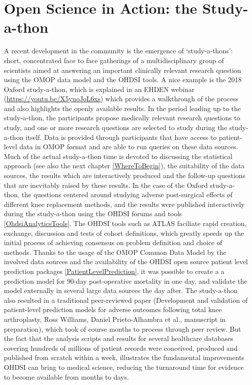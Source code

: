 \documentclass[11pt]{book}
\theoremstyle{definition}
\theoremstyle{definition}
\theoremstyle{definition}
\theoremstyle{remark}
\begin{document}
\hypertarget{open-science-in-action-the-study-a-thon}{%
\section{Open Science in Action: the Study-a-thon}\label{open-science-in-action-the-study-a-thon}}


A recent development in the community is the emergence of `study-a-thons': short, concentrated face to face gatherings of a multidisciplinary group of scientists aimed at answering an important clinically relevant research question using the OMOP data model and the OHDSI tools. A nice example is the 2018 Oxford study-a-thon, which is explained in an EHDEN webinar (\url{https://youtu.be/X5yuoJoL6xs}) which provides a walkthrough of the process and also highlights the openly available results. In the period leading up to the study-a-thon, the participants propose medically relevant research questions to study, and one or more research questions are selected to study during the study-a-thon itself. Data is provided through participants that have access to patient-level data in OMOP format and are able to run queries on these data sources. Much of the actual study-a-thon time is devoted to discussing the statistical approach (see also the next chapter \ref{WhereToBegin}), the suitability of the data sources, the results which are interactively produced and the follow-up questions that are inevitably raised by these results. In the case of the Oxford study-a-thon, the questions centered around studying adverse post-surgical effects of different knee replacement methods, and the results were published interactively during the study-a-thon using the OHDSI forums and tools \ref{OhdsiAnalyticsTools}. The OHDSI tools such as ATLAS faciliate rapid creation, exchange, discussion and tests of cohort definitions, which greatly speeds up the initial process of achieving consensus on problem definition and choice of methods. Thanks to the usage of the OMOP Common Data Model by the involved data sources and the availability of the OHDSI open source patient level prediction packages \ref{PatientLevelPrediction}, it was possible to create a a prediction model for 90-day post-operative mortality in one day, and validate the model externally in several large data sources the day after. The study-a-thon also resulted in a traditional peer-reviewed paper (Development and validation of patient-level prediction models for adverse outcomes following total knee arthroplasty, Ross Williams, Daniel Prieto-Alhambra et al., manuscript in preparation), which took of course months to process through peer review. But the fact that the analysis scripts and results for several healthcare databases covering hundreds of millions of patient records were conceived, produced and published from scratch within a week, illustrates the fundamental improvements OHDSI can bring to medical science, reducing the turnaround time for evidence to become available from months to days.
\end{document}
